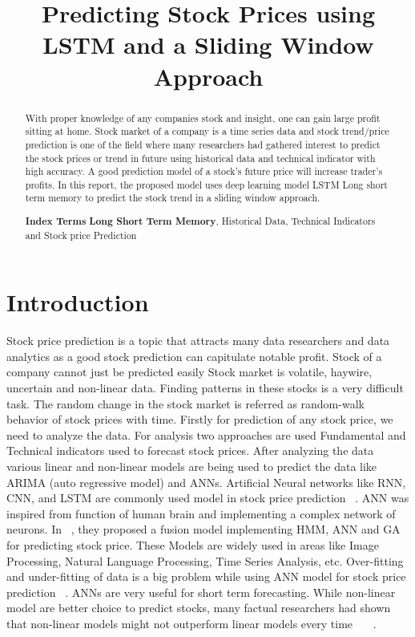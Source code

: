\documentclass[5p,,preprint,12pt,twocolumn]{elsarticle}
\begin{document}
\begin{frontmatter}
	
\title{Predicting Stock Prices using LSTM and a Sliding Window Approach
}
    
    

\begin{abstract}
 With proper knowledge of any companies stock and insight, one can gain large profit sitting at home. Stock market of a company is a time series data and stock trend/price prediction is one of the field where many researchers had gathered interest to predict the stock prices or trend in future using historical data and technical indicator with high accuracy. A good prediction model of a stock's future price will increase trader's profits. In this report, the proposed model uses deep learning model LSTM {\textemdash} Long short term memory to predict the stock trend in a sliding window approach. 

\textbf{Index Terms}{\textendash} \textbf{Long Short Term Memory}, Historical Data, Technical Indicators and Stock price Prediction


\end{abstract}
\end{frontmatter}
    
\section{Introduction}
 Stock price prediction is a topic that attracts many data researchers and data analytics as a good stock prediction can capitulate notable profit. Stock of a company cannot just be predicted easily Stock market is volatile, haywire, uncertain and non-linear data. Finding patterns in these stocks is a very difficult task. The random change in the stock market is referred as random-walk behavior of stock prices with time. Firstly for prediction of any stock price, we need to analyze the data. For analysis two approaches are used Fundamental and Technical indicators used to forecast stock prices. After analyzing the data various linear and non-linear models are being used to predict the data like ARIMA (auto regressive model) and ANNs. Artificial Neural networks like RNN, CNN, and LSTM are commonly used model in stock price prediction \unskip~\cite{485690:10916371}. ANN was inspired from function of human brain and implementing a complex network of neurons. In \unskip~\cite{485690:10916372}, they proposed a fusion model implementing HMM, ANN and GA for predicting stock price. These Models are widely used in areas like Image Processing, Natural Language Processing, Time Series Analysis, etc. Over-fitting and under-fitting of data is a big problem while using ANN model for stock price prediction \unskip~\cite{485690:10916375}. ANNs are very useful for short term forecasting. While non-linear model are better choice to predict stocks, many factual researchers had shown that non-linear models might not outperform linear models every time \unskip~\cite{485690:10916374}\unskip~\cite{485690:10916376}\unskip~\cite{485690:10916377}.
\end{document}
